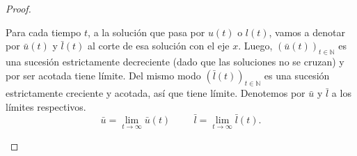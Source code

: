 \documentclass[../pheader.tex]{subfiles}
\begin{document}
\begin{proof}
\begin{plist}
    Para cada tiempo \(t\), a la solución que pasa por \(u(t)\) o \(l(t)\),
    vamos a denotar por \(\bar{u}(t)\) y \(\bar{l}(t)\) al corte de esa
    solución con el eje \(x\).
    Luego, \(\left(\bar{u}(t)\right)_{t\in \mathbb{N}}\) es una sucesión
    estrictamente decreciente (dado que las soluciones no se cruzan) y por ser
    acotada tiene límite. Del mismo modo \(\left(\bar{l}(t)\right)_{t\in
    \mathbb{N}}\) es una sucesión estrictamente creciente y acotada, así que
    tiene límite. Denotemos por \(\bar{u}\) y \(\bar{l}\) a los límites
    respectivos.
    \[
        \bar{u} = \lim_{t \to \infty} \bar{u}(t)
        \hspace{1cm}
        \bar{l} = \lim_{t \to \infty} \bar{l}(t)
    .\]

\end{plist}
\end{proof}
\end{document}
